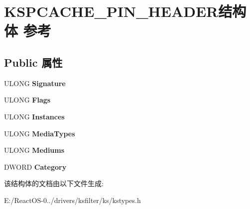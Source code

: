 \hypertarget{struct_k_s_p_c_a_c_h_e___p_i_n___h_e_a_d_e_r}{}\section{K\+S\+P\+C\+A\+C\+H\+E\+\_\+\+P\+I\+N\+\_\+\+H\+E\+A\+D\+E\+R结构体 参考}
\label{struct_k_s_p_c_a_c_h_e___p_i_n___h_e_a_d_e_r}
\subsection*{Public 属性}
\begin{DoxyCompactItemize}
\item 
\mbox{\label{struct_k_s_p_c_a_c_h_e___p_i_n___h_e_a_d_e_r_a21763ffeaadfbc62bc7a21ff16855038}} 
U\+L\+O\+NG {\bfseries Signature}
\item 
\mbox{\label{struct_k_s_p_c_a_c_h_e___p_i_n___h_e_a_d_e_r_a3aec2ee180c39a570714150986c87a35}} 
U\+L\+O\+NG {\bfseries Flags}
\item 
\mbox{\label{struct_k_s_p_c_a_c_h_e___p_i_n___h_e_a_d_e_r_abf7470a4a2e553627da8b96a60788969}} 
U\+L\+O\+NG {\bfseries Instances}
\item 
\mbox{\label{struct_k_s_p_c_a_c_h_e___p_i_n___h_e_a_d_e_r_abb825019ec192b2d70b8643374e02069}} 
U\+L\+O\+NG {\bfseries Media\+Types}
\item 
\mbox{\label{struct_k_s_p_c_a_c_h_e___p_i_n___h_e_a_d_e_r_a252e6eda6394144c395153bdff69dd85}} 
U\+L\+O\+NG {\bfseries Mediums}
\item 
\mbox{\label{struct_k_s_p_c_a_c_h_e___p_i_n___h_e_a_d_e_r_aa09c3ae049ef25b686491b1588885211}} 
D\+W\+O\+RD {\bfseries Category}
\end{DoxyCompactItemize}


该结构体的文档由以下文件生成\+:\begin{DoxyCompactItemize}
\item 
E\+:/\+React\+O\+S-\/0../drivers/ksfilter/ks/kstypes.\+h\end{DoxyCompactItemize}

